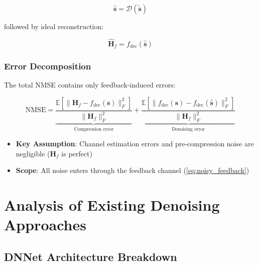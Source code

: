 \documentclass[lettersize,journal]{IEEEtran}
\begin{document}
\begin{equation}
    \hat{\mathbf{s}} = \mathcal{D}(\tilde{\mathbf{s}})
\end{equation}

followed by ideal reconstruction:

\begin{equation}
    \hat{\mathbf{H}}_f = f_{\text{dec}}(\hat{\mathbf{s}})
\end{equation}

\subsubsection{Error Decomposition}
The total NMSE contains only feedback-induced errors:

\begin{equation}
    \text{NMSE} = \underbrace{\frac{\mathbb{E}[\|\mathbf{H}_f - f_{\text{dec}}(\mathbf{s})\|_F^2]}{\|\mathbf{H}_f\|_F^2}}_{\text{Compression error}} + \underbrace{\frac{\mathbb{E}[\|f_{\text{dec}}(\mathbf{s}) - f_{\text{dec}}(\hat{\mathbf{s}})\|_F^2]}{\|\mathbf{H}_f\|_F^2}}_{\text{Denoising error}}
\end{equation}

\begin{itemize}
    \item \textbf{Key Assumption}: Channel estimation errors and pre-compression noise are negligible ($\mathbf{H}_f$ is perfect)
    \item \textbf{Scope}: All noise enters through the feedback channel (\eqref{eq:noisy_feedback})
\end{itemize}

\section{Analysis of Existing Denoising Approaches}
\subsection{DNNet Architecture Breakdown}
\end{document}

